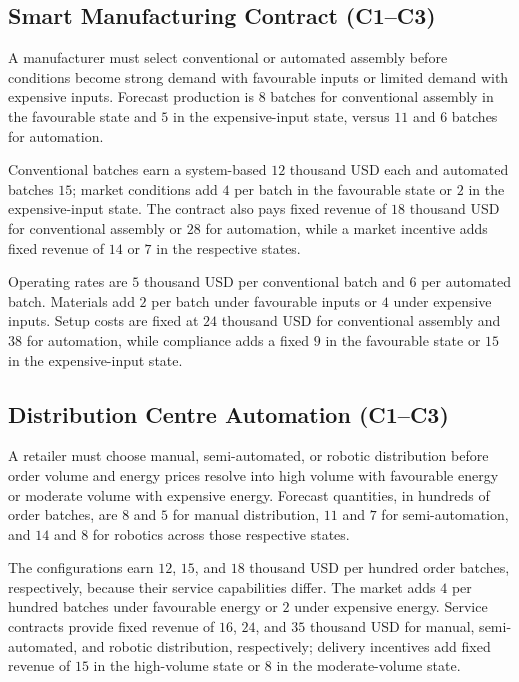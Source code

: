 	\subsection{Smart Manufacturing Contract (C1--C3)}
	\label{sec:problem19-smart-manufacturing-contract-c1-c3}

	A manufacturer must select conventional or automated assembly before conditions become strong demand with favourable inputs or limited demand with expensive inputs. Forecast production is \(8\) batches for conventional assembly in the favourable state and \(5\) in the expensive-input state, versus \(11\) and \(6\) batches for automation.

	Conventional batches earn a system-based \(12\) thousand USD each and automated batches \(15\); market conditions add \(4\) per batch in the favourable state or \(2\) in the expensive-input state. The contract also pays fixed revenue of \(18\) thousand USD for conventional assembly or \(28\) for automation, while a market incentive adds fixed revenue of \(14\) or \(7\) in the respective states.

	Operating rates are \(5\) thousand USD per conventional batch and \(6\) per automated batch. Materials add \(2\) per batch under favourable inputs or \(4\) under expensive inputs. Setup costs are fixed at \(24\) thousand USD for conventional assembly and \(38\) for automation, while compliance adds a fixed \(9\) in the favourable state or \(15\) in the expensive-input state.

	\subsection{Distribution Centre Automation (C1--C3)}
	\label{sec:problem20-distribution-centre-automation-c1-c3}

	A retailer must choose manual, semi-automated, or robotic distribution before order volume and energy prices resolve into high volume with favourable energy or moderate volume with expensive energy. Forecast quantities, in hundreds of order batches, are \(8\) and \(5\) for manual distribution, \(11\) and \(7\) for semi-automation, and \(14\) and \(8\) for robotics across those respective states.

	The configurations earn \(12\), \(15\), and \(18\) thousand USD per hundred order batches, respectively, because their service capabilities differ. The market adds \(4\) per hundred batches under favourable energy or \(2\) under expensive energy. Service contracts provide fixed revenue of \(16\), \(24\), and \(35\) thousand USD for manual, semi-automated, and robotic distribution, respectively; delivery incentives add fixed revenue of \(15\) in the high-volume state or \(8\) in the moderate-volume state.

